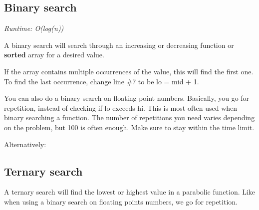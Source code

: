
\subsection*{Binary search}

\textit{Runtime: O(log(n))}

A binary search will search through an increasing or decreasing function or \textbf{sorted} array for a desired value.



If the array contains multiple occurrences of the value, this will find the first one. To find the last occurrence, change line \#7 to be lo = mid + 1.



You can also do a binary search on floating point numbers. Basically, you go for repetition, instead of checking if lo exceeds hi. This is most often used when binary searching a function. The number of repetitions you need varies depending on the problem, but 100 is often enough. Make sure to stay within the time limit.



Alternatively:



\subsection*{Ternary search}

A ternary search will find the lowest or highest value in a parabolic function. Like when using a binary search on floating points numbers, we go for repetition.



\newpage
